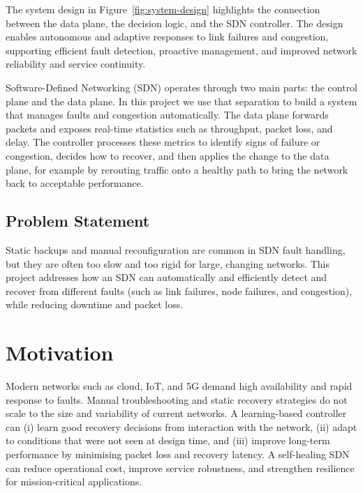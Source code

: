 \documentclass[12pt,a4paper]{report}
\begin{document}
The system design in Figure~\ref{fig:system-design} highlights the connection between the
data plane, the decision logic, and the SDN controller. The design enables autonomous and
adaptive responses to link failures and congestion, supporting efficient fault detection,
proactive management, and improved network reliability and service continuity.

Software-Defined Networking (SDN) operates through two main parts: the control plane and
the data plane. In this project we use that separation to build a system that manages
faults and congestion automatically. The data plane forwards packets and exposes real-time
statistics such as throughput, packet loss, and delay. The controller processes these
metrics to identify signs of failure or congestion, decides how to recover, and then applies
the change to the data plane, for example by rerouting traffic onto a healthy path to bring
the network back to acceptable performance.

\subsection*{Problem Statement}
Static backups and manual reconfiguration are common in SDN fault handling, but they are
often too slow and too rigid for large, changing networks. This project addresses how an SDN
can automatically and efficiently detect and recover from different faults (such as link
failures, node failures, and congestion), while reducing downtime and packet loss.

\section{Motivation}
Modern networks such as cloud, IoT, and 5G demand high availability and rapid response to
faults. Manual troubleshooting and static recovery strategies do not scale to the size and
variability of current networks. A learning-based controller can (i) learn good recovery
decisions from interaction with the network, (ii) adapt to conditions that were not seen at
design time, and (iii) improve long-term performance by minimising packet loss and recovery
latency. A self-healing SDN can reduce operational cost, improve service robustness, and
strengthen resilience for mission-critical applications.
\end{document}
